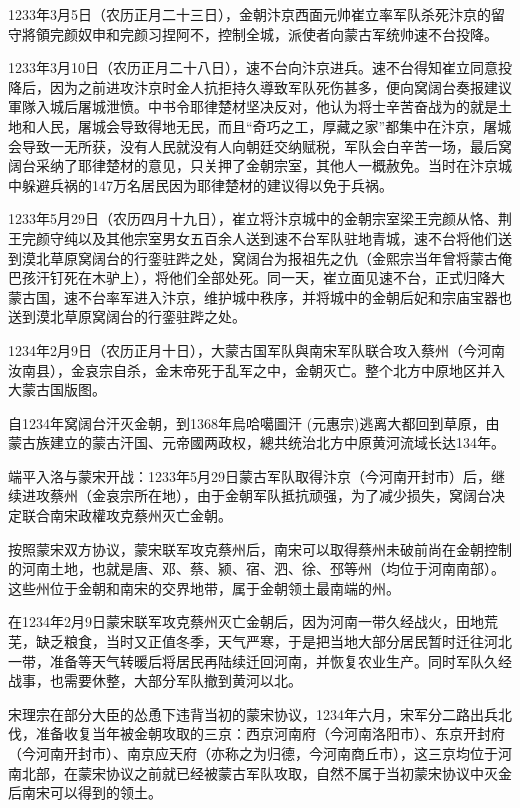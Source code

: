 1233年3月5日（农历正月二十三日），金朝汴京西面元帅崔立率军队杀死汴京的留守將領完颜奴申和完颜习捏阿不，控制全城，派使者向蒙古军统帅速不台投降。

1233年3月10日（农历正月二十八日），速不台向汴京进兵。速不台得知崔立同意投降后，因为之前进攻汴京时金人抗拒持久導致军队死伤甚多，便向窝阔台奏报建议軍隊入城后屠城泄愤。中书令耶律楚材坚决反对，他认为将士辛苦奋战为的就是土地和人民，屠城会导致得地无民，而且“奇巧之工，厚藏之家”都集中在汴京，屠城会导致一无所获，没有人民就没有人向朝廷交纳赋税，军队会白辛苦一场，最后窝阔台采纳了耶律楚材的意见，只关押了金朝宗室，其他人一概赦免。当时在汴京城中躲避兵祸的147万名居民因为耶律楚材的建议得以免于兵祸。

1233年5月29日（农历四月十九日），崔立将汴京城中的金朝宗室梁王完颜从恪、荆王完颜守纯以及其他宗室男女五百余人送到速不台军队驻地青城，速不台将他们送到漠北草原窝阔台的行銮驻跸之处，窝阔台为报祖先之仇（金熙宗当年曾将蒙古俺巴孩汗钉死在木驴上），将他们全部处死。同一天，崔立面见速不台，正式归降大蒙古国，速不台率军进入汴京，维护城中秩序，并将城中的金朝后妃和宗庙宝器也送到漠北草原窝阔台的行銮驻跸之处。

1234年2月9日（农历正月十日），大蒙古国军队與南宋军队联合攻入蔡州（今河南汝南县），金哀宗自杀，金末帝死于乱军之中，金朝灭亡。整个北方中原地区并入大蒙古国版图。

自1234年窝阔台汗灭金朝，到1368年烏哈噶圖汗 (元惠宗)逃离大都回到草原，由蒙古族建立的蒙古汗国、元帝國两政权，總共统治北方中原黄河流域长达134年。

端平入洛与蒙宋开战：1233年5月29日蒙古军队取得汴京（今河南开封市）后，继续进攻蔡州（金哀宗所在地），由于金朝军队抵抗顽强，为了减少损失，窝阔台决定联合南宋政權攻克蔡州灭亡金朝。

按照蒙宋双方协议，蒙宋联军攻克蔡州后，南宋可以取得蔡州未破前尚在金朝控制的河南土地，也就是唐、邓、蔡、颍、宿、泗、徐、邳等州（均位于河南南部）。这些州位于金朝和南宋的交界地带，属于金朝领土最南端的州。

在1234年2月9日蒙宋联军攻克蔡州灭亡金朝后，因为河南一带久经战火，田地荒芜，缺乏粮食，当时又正值冬季，天气严寒，于是把当地大部分居民暂时迁往河北一带，准备等天气转暖后将居民再陆续迁回河南，并恢复农业生产。同时军队久经战事，也需要休整，大部分军队撤到黄河以北。

宋理宗在部分大臣的怂恿下违背当初的蒙宋协议，1234年六月，宋军分二路出兵北伐，准备收复当年被金朝攻取的三京：西京河南府（今河南洛阳市）、东京开封府（今河南开封市）、南京应天府（亦称之为归德，今河南商丘市），这三京均位于河南北部，在蒙宋协议之前就已经被蒙古军队攻取，自然不属于当初蒙宋协议中灭金后南宋可以得到的领土。

